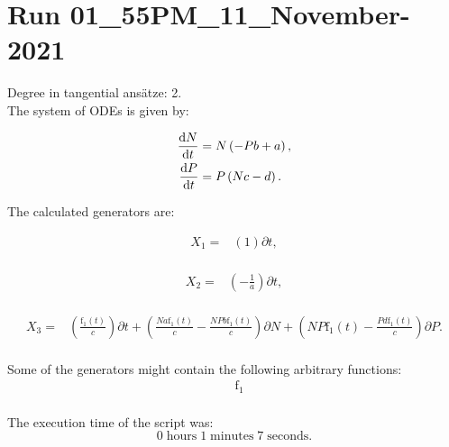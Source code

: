\section*{Run 01\_55PM\_11\_November-2021}
Degree in tangential ansätze:	2.\\
The system of ODEs is given by:

\begin{align*}
\dv{N}{t}&=N \left(- P b + a\right),\\
\dv{P}{t}&=P \left(N c - d\right).\\
\end{align*}

\noindent The calculated generators are:

\begin{align*}
X_{1}=&\left(1 \right)\partial t,\\
\end{align*}

\begin{align*}
X_{2}=&\left(- \frac{1}{a} \right)\partial t,\\
\end{align*}

\begin{align*}
X_{3}=&\left(\frac{\operatorname{f_{1}}{\left(t \right)}}{c} \right)\partial t+\left(\frac{N a \operatorname{f_{1}}{\left(t \right)}}{c}- \frac{N P b \operatorname{f_{1}}{\left(t \right)}}{c} \right)\partial N+\left(N P \operatorname{f_{1}}{\left(t \right)} - \frac{P d \operatorname{f_{1}}{\left(t \right)}}{c} \right)\partial P.\\
\end{align*}



\noindent Some of the generators might contain the following arbitrary functions:
\begin{align*}
&\operatorname{f_{1}}\\
\end{align*}

\noindent The execution time of the script was:
$$0\;\mathrm{hours}\;1\;\mathrm{minutes}\;7 \;\mathrm{seconds}.$$
